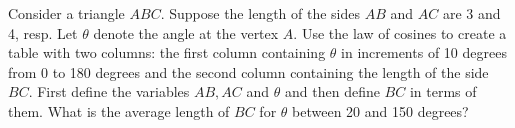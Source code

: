 {Consider a triangle $ABC$.  Suppose the length of the sides $AB$ and $AC$ are 3 and 4, resp.  Let $\theta$ denote the angle at the vertex $A$.  Use the law of cosines to create a table with two columns: the first column containing $\theta$ in increments of 10 degrees from 0 to 180 degrees and the second column containing the length of the side $BC$.  First define the variables $AB, AC$ and $\theta$ and then define $BC$ in terms of them.
What is the average length of $BC$ for $\theta$ between 20 and 150 degrees?}
{}
